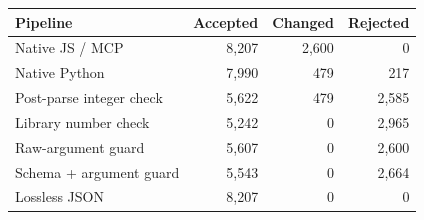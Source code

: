 \begin{tabular}{lrrr}
\toprule
Pipeline & Accepted & Changed & Rejected \\
\midrule
Native JS / MCP & 8,207 & 2,600 & 0 \\
Native Python & 7,990 & 479 & 217 \\
Post-parse integer check & 5,622 & 479 & 2,585 \\
Library number check & 5,242 & 0 & 2,965 \\
Raw-argument guard & 5,607 & 0 & 2,600 \\
Schema + argument guard & 5,543 & 0 & 2,664 \\
Lossless JSON & 8,207 & 0 & 0 \\
\bottomrule
\end{tabular}
